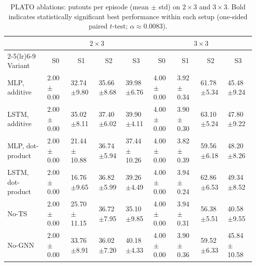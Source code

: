 \begin{table}[h]
\centering
\small
\setlength{\tabcolsep}{1.4pt}
\renewcommand{\arraystretch}{1.02}
\begin{tabular}{@{\hspace{2pt}}l|l|l|l|l||l|l|l|l@{\hspace{2pt}}}
\toprule
& \multicolumn{4}{c||}{$2\times 3$} & \multicolumn{4}{c}{$3\times 3$} \\
\cmidrule(lr){2-5}\cmidrule(lr){6-9}
Variant & \multicolumn{1}{c|}{S0} & \multicolumn{1}{c|}{S1} & \multicolumn{1}{c|}{S2} & \multicolumn{1}{c||}{S3}
        & \multicolumn{1}{c|}{S0} & \multicolumn{1}{c|}{S1} & \multicolumn{1}{c|}{S2} & \multicolumn{1}{c}{S3} \\
\midrule
MLP, additive      & 2.00$\pm$0.00 & 32.74$\pm$9.80 & 35.66$\pm$8.68 & 39.98$\pm$6.76
                  & 4.00$\pm$0.00 & 3.92$\pm$0.34 & 61.78$\pm$5.34 & 45.48$\pm$9.24 \\
LSTM, additive     & 2.00$\pm$0.00 & 35.02$\pm$8.11 & 37.40$\pm$6.02 & 39.90$\pm$4.11
                  & 4.00$\pm$0.00 & 3.90$\pm$0.30 & 63.10$\pm$5.24 & 47.80$\pm$9.22 \\
MLP, dot-product   & 2.00$\pm$0.00 & 21.44$\pm$10.88 & 36.74$\pm$5.94 & 37.44$\pm$10.26
                  & 4.00$\pm$0.00 & 3.82$\pm$0.39 & 59.56$\pm$6.18 & 48.20$\pm$8.26 \\
LSTM, dot-product  & 2.00$\pm$0.00 & 16.76$\pm$9.65 & 36.82$\pm$5.99 & 39.26$\pm$4.49
                  & 4.00$\pm$0.00 & 3.94$\pm$0.24 & 62.86$\pm$6.53 & 49.34$\pm$8.52 \\
No-TS              & 2.00$\pm$0.00 & 25.70$\pm$11.15 & 36.72$\pm$7.95 & 35.10$\pm$9.85
                  & 4.00$\pm$0.00 & 3.94$\pm$0.31 & 56.38$\pm$5.51 & 40.58$\pm$9.55 \\
No-GNN             & 2.00$\pm$0.00 & 33.76$\pm$8.91 & 36.02$\pm$7.20 & 40.18$\pm$4.33
                  & 4.00$\pm$0.00 & 3.90$\pm$0.36 & 59.52$\pm$6.33 & 45.84$\pm$10.58 \\
\bottomrule
\end{tabular}
\caption{PLATO ablations: putouts per episode (mean $\pm$ std) on $2\times 3$ and $3\times 3$. Bold indicates statistically significant best performance within each setup (one-sided paired $t$-test; $\alpha\approx0.0083$).}
\label{tab:ablate_putouts_2x3_3x3}
\end{table}


